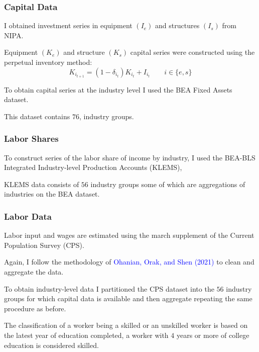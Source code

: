 \documentclass[notes,11pt, aspectratio=169]{beamer}
\newenvironment{wideitemize}{\itemize\addtolength{\itemsep}{10pt}}{\enditemize}
\begin{document}
\begin{frame}
\frametitle{Capital Data}
\begin{wideitemize}
 \item I obtained investment series in equipment $(I_e)$ and structures $(I_s)$ from NIPA.
 \item Equipment $(K_e)$ and structure $(K_s)$ capital series were constructed using the perpetual inventory method:
 \begin{equation*}\label{eq:capital_law_motion}
 K_{i_{t+1}} = (1 - \delta_{i_t}) K_{i_{t}} + I_{i_{t}} \qquad i\in\{e, s\}
 \end{equation*}
 \item To obtain capital series at the industry level I used the BEA Fixed Assets dataset.
 \item This dataset contains $76$, industry groups. 
\end{wideitemize}
\end{frame}

\begin{frame}
 \frametitle{Labor Shares}
 \begin{wideitemize}
 \item To construct series of the labor share of income by industry, I used the BEA-BLS Integrated Industry-level Production Accounts (KLEMS), 
 \item KLEMS data consists of $56$ industry groups some of which are aggregations of industries on the BEA dataset.
\end{wideitemize}
\end{frame}

\begin{frame}
\frametitle{Labor Data}
\begin{wideitemize}
 \item Labor input and wages are estimated using the march supplement of the Current Population Survey (CPS).
 \item Again, I follow the methodology of \textcolor{blue}{Ohanian, Orak, and Shen (2021)} to clean and aggregate the data.
 \item To obtain industry-level data I partitioned the CPS dataset into the $56$ industry groups for which capital data is available and then aggregate repeating the same procedure as before.
 \item The classification of a worker being a skilled or an unskilled worker is based on the latest year of education completed, a worker with $4$ years or more of college education is considered skilled.
\end{wideitemize}
\end{frame}
\end{document}
